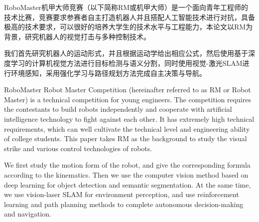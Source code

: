 \documentclass{NCEPUthesis}
\begin{document}


\distanceLogoTitle{2cm}%







\NCEPUcover%
\newpage
\NCEPUabstract

\begin{NCEPUabstracttext}
	RoboMaster机甲大师竞赛（以下简称RM或机甲大师）是一个面向青年工程师的技术比赛，竞赛要求参赛者自主打造机器人并且搭配人工智能技术进行对抗，具备极高的技术要求，可以很好的培养大学生的技术水平与工程能力，本论文以RM为背景，研究机器人的视觉打击与多种控制技术。

	我们首先研究机器人的运动形式，并且根据运动学给出相应公式，然后使用基于深度学习的计算机视觉方法进行目标检测与语义分割，同时使用视觉-激光SLAM进行环境感知，采用强化学习与路径规划方法完成自主决策与导航。
\end{NCEPUabstracttext}

\begin{NCEPUenabstract}%
RoboMaster Robot Master Competition (hereinafter referred to as RM or Robot Master) is a technical competition for young engineers. The competition requires the contestants to build robots independently and cooperate with artificial intelligence technology to fight against each other. It has extremely high technical requirements, which can well cultivate the technical level and engineering ability of college students. This paper takes RM as the background to study the visual strike and various control technologies of robots.

We first study the motion form of the robot, and give the corresponding formula according to the kinematics. Then we use the computer vision method based on deep learning for object detection and semantic segmentation. At the same time, we use vision-laser SLAM for environment perception, and use reinforcement learning and path planning methods to complete autonomous decision-making and navigation.
\end{NCEPUenabstract}
\tableofcontents%
\newpage
{}%
\end{document}
